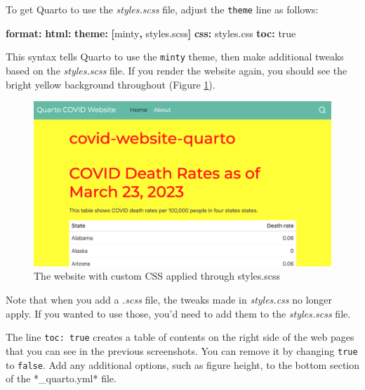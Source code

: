 \documentclass[
]{book}
\newenvironment{Shaded}{\begin{snugshade}}{\end{snugshade}}
\newcommand{\AttributeTok}[1]{\textcolor[rgb]{0.13,0.29,0.53}{#1}}
\newcommand{\CharTok}[1]{\textcolor[rgb]{0.31,0.60,0.02}{#1}}
\newcommand{\FunctionTok}[1]{\textcolor[rgb]{0.13,0.29,0.53}{\textbf{#1}}}
\newcommand{\KeywordTok}[1]{\textcolor[rgb]{0.13,0.29,0.53}{\textbf{#1}}}
\begin{document}
To get Quarto to use the \emph{styles.scss} file, adjust the \texttt{theme} line as follows:

\begin{Shaded}
\begin{Highlighting}[]
\FunctionTok{format}\KeywordTok{:}
\AttributeTok{  }\FunctionTok{html}\KeywordTok{:}
\AttributeTok{        }\FunctionTok{theme}\KeywordTok{:}\AttributeTok{ }\KeywordTok{[}\AttributeTok{minty}\KeywordTok{,}\AttributeTok{ styles.scss}\KeywordTok{]}
\AttributeTok{    }\FunctionTok{css}\KeywordTok{:}\AttributeTok{ styles.css}
\AttributeTok{    }\FunctionTok{toc}\KeywordTok{:}\AttributeTok{ }\CharTok{true}
\end{Highlighting}
\end{Shaded}

This syntax tells Quarto to use the \texttt{minty} theme, then make additional tweaks based on the \emph{styles.scss} file. If you render the website again, you should see the bright yellow background throughout (Figure \ref{fig:quarto-website-scss}).

\begin{figure}
\includegraphics[width=1\linewidth]{assets/quarto-website-scss} \caption{The website with custom CSS applied through styles.scss}\label{fig:quarto-website-scss}
\end{figure}

Note that when you add a \emph{.scss} file, the tweaks made in \emph{styles.css} no longer apply. If you wanted to use those, you'd need to add them to the \emph{styles.scss} file.

The line \texttt{toc:\ true} creates a table of contents on the right side of the web pages that you can see in the previous screenshots. You can remove it by changing \texttt{true} to \texttt{false}. Add any additional options, such as figure height, to the bottom section of the *\_quarto.yml* file.
\end{document}
